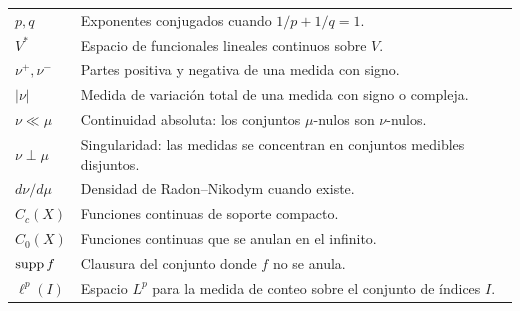 \begin{longtable}{@{}p{}p{}@{}}
$p,q$ & Exponentes conjugados cuando $1/p+1/q=1$.\\
$V^*$ & Espacio de funcionales lineales continuos sobre $V$.\\
$\nu^+,\nu^-$ & Partes positiva y negativa de una medida con signo.\\
$|\nu|$ & Medida de variación total de una medida con signo o compleja.\\
$\nu\ll\mu$ & Continuidad absoluta: los conjuntos $\mu$-nulos son $\nu$-nulos.\\
$\nu\perp\mu$ & Singularidad: las medidas se concentran en conjuntos medibles disjuntos.\\
$d\nu/d\mu$ & Densidad de Radon--Nikodym cuando existe.\\
$C_c(X)$ & Funciones continuas de soporte compacto.\\
$C_0(X)$ & Funciones continuas que se anulan en el infinito.\\
$\operatorname{supp} f$ & Clausura del conjunto donde $f$ no se anula.\\
$\ell^p(I)$ & Espacio $L^p$ para la medida de conteo sobre el conjunto de índices $I$.\\
\bottomrule
\end{longtable}
